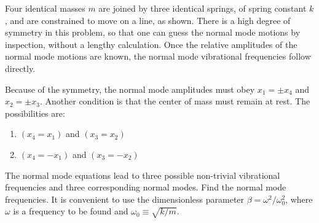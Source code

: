 \documentclass[12pt,letterpaper]{hmcpset}
\begin{document}
\begin{problem}

    Four identical masses $m$ are joined by
    three identical springs, of spring constant
    $k$, and are constrained to move on a line,
    as shown. There is a high degree of symmetry
    in this problem, so that one can guess the normal mode
    motions by inspection, without a lengthy
    calculation. Once the relative amplitudes of
    the normal mode motions are known, the normal
    mode vibrational frequencies follow directly.

    \begin{center}
    \end{center}

    Because of the symmetry, the normal mode
    amplitudes must obey $x_{1} = \pm x_{4}$
    and $x_{2} = \pm x_{3}$. Another condition
    is that the center of mass must remain at
    rest. The possibilities are:

    \begin{enumerate}
        \item $(x_{4} = x_{1})$ and $(x_{3} = x_{2})$
        \item $(x_{4} = -x_{1})$ and $(x_{3} = -x_{2})$
    \end{enumerate}

    The normal mode equations lead to three
    possible non-trivial vibrational frequencies
    and three corresponding normal modes.
    Find the normal mode frequencies. It is
    convenient to use the dimensionless parameter $\beta =
    \omega^{2}/\omega_{0}^{2}$, where $\omega$ is
    a frequency to be found and $\omega_{0} \equiv \sqrt{k/m}$.
\end{problem}

\begin{solution}
    \vfill
\end{solution}
\clearpage
\end{document}
